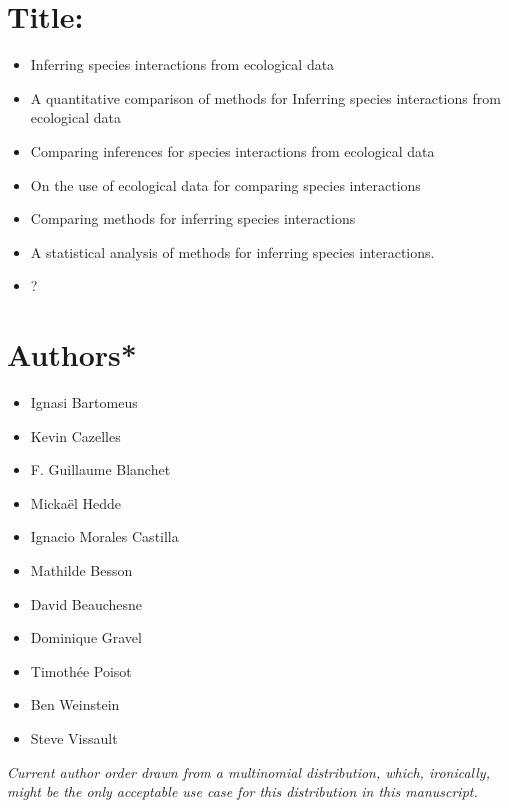 


\linenumbers
\modulolinenumbers[1]

\doublespacing

\section{Title:}
\label{title}

\begin{itemize}
  \item Inferring species interactions from ecological data
  \item A quantitative comparison of methods for Inferring species interactions
  from ecological data
\item Comparing inferences for species interactions from ecological data
\item On the use of ecological data for comparing species interactions
\item Comparing methods for inferring species interactions
\item A statistical analysis of methods for inferring species interactions.
\item ?
\end{itemize}

\section{Authors*}\label{authors}

\begin{itemize}
  \item Ignasi Bartomeus
  \item Kevin Cazelles
  \item F. Guillaume Blanchet
  \item Mickaël Hedde
  \item Ignacio Morales Castilla
  \item Mathilde Besson
  \item David Beauchesne
  \item Dominique Gravel
  \item Timothée Poisot
  \item Ben Weinstein
  \item Steve Vissault
\end{itemize}

\emph{Current author order drawn from a multinomial distribution, which,
ironically, might be the only acceptable use case for this distribution in this
manuscript.}

